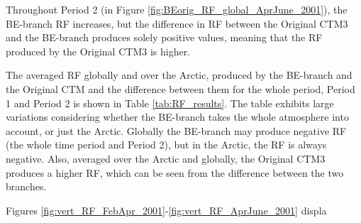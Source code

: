 \medskip

Throughout Period 2 (in Figure \ref{fig:BEorig_RF_global_AprJune_2001}), the BE-branch RF increases, but the difference in RF between the Original CTM3 and the BE-branch produces solely positive values, meaning that the RF produced by the Original CTM3 is higher.

\medskip

The averaged RF globally and over the Arctic, produced by the BE-branch and the Original CTM and the difference between them for the whole period, Period 1 and Period 2 is shown in Table \ref{tab:RF_results}. The table exhibits large variations considering whether the BE-branch takes the whole atmosphere into account, or just the Arctic. Globally the BE-branch may produce negative RF (the whole time period and Period 2), but in the Arctic, the RF is always negative. Also, averaged over the Arctic and globally, the Original CTM3 produces a higher RF, which can be seen from the difference between the two branches. 

\medskip






Figures \ref{fig:vert_RF_FebApr_2001}-\ref{fig:vert_RF_AprJune_2001} displa


